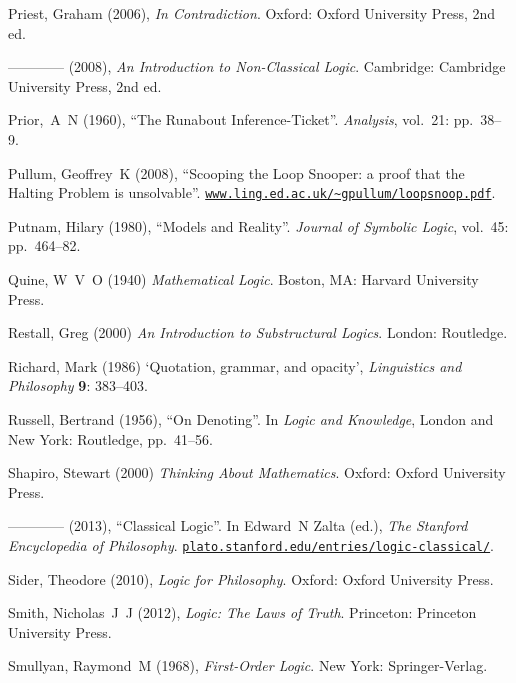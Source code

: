 \documentclass[openany,leqno,10pt]{book}
\theoremstyle{break}
\theoremstyle{definition}
\theoremstyle{remark}
\begin{document}
{\begin{thebibliography}{39}
Priest, Graham (2006), \emph{In Contradiction}. Oxford: Oxford University
  Press, 2nd ed.

---\!\!---\!\!---\!\!--- (2008), \emph{An Introduction to Non-Classical Logic}. Cambridge: Cambridge University Press, 2nd ed. 

Prior,~A~N (1960), \enquote{The Runabout Inference-Ticket}. \emph{Analysis},
  vol.~21: pp.~38–9.

Pullum, Geoffrey~K (2008), \enquote{Scooping the Loop Snooper: a proof that
  the Halting Problem is unsolvable}.
  \urlprefix\href{http://www.ling.ed.ac.uk/~gpullum/loopsnoop.pdf}{\nolinkurl{www.ling.ed.ac.uk/~gpullum/loopsnoop.pdf}}.

Putnam, Hilary (1980), \enquote{Models and Reality}. \emph{Journal of Symbolic
  Logic}, vol.~45: pp.~464–82.

 Quine, W~V~O (1940) \emph{Mathematical Logic}. Boston, MA: Harvard University Press.

Restall, Greg (2000) \emph{An Introduction to Substructural Logics}. London: Routledge.

 Richard, Mark (1986) `Quotation, grammar, and opacity', \emph{Linguistics and Philosophy} \textbf{9}: 383–403.

Russell, Bertrand (1956), \enquote{On Denoting}. In \emph{Logic and
  Knowledge}, London and New York: Routledge, pp.~41–56.

 Shapiro, Stewart (2000) \emph{Thinking About Mathematics}. Oxford: Oxford University Press.

---\!\!---\!\!---\!\!---  (2013), \enquote{Classical Logic}. In Edward~N Zalta (ed.),
  \emph{The Stanford Encyclopedia of Philosophy}. \urlprefix\href{http://plato.stanford.edu/entries/logic-classical/}{\nolinkurl{plato.stanford.edu/entries/logic-classical/}}.

Sider, Theodore (2010), \emph{Logic for Philosophy}. Oxford: Oxford University Press.

Smith, Nicholas~J~J (2012), \emph{Logic: The Laws of Truth}. Princeton: Princeton University Press.


Smullyan, Raymond~M (1968), \emph{First-Order Logic}. New York: Springer-Verlag.


\end{thebibliography}}
\end{document}
